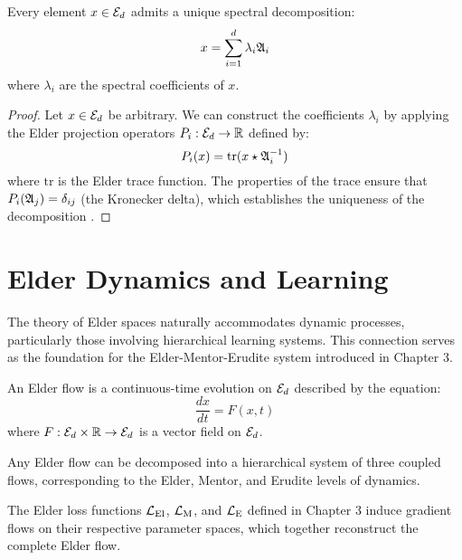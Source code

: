 \begin{theorem}
Every element $x \in \mathcal{E}_{d}$ admits a unique spectral decomposition:
\begin{equation}
x = \sum_{i=1}^{d} \lambda_i \mathfrak{A}_{i}
\end{equation}
where $\lambda_i$ are the spectral coefficients of $x$.
\end{theorem}

\begin{proof}
Let $x \in \mathcal{E}_{d}$ be arbitrary. We can construct the coefficients $\lambda_i$ by applying the Elder projection operators $P_i : \mathcal{E}_{d} \to \mathbb{R}$ defined by:
\begin{equation}
P_i(x) = \text{tr}(x \star \mathfrak{A}_{i}^{-1})
\end{equation}
where $\text{tr}$ is the Elder trace function. The properties of the trace ensure that $P_i(\mathfrak{A}_{j}) = \delta_{ij}$ (the Kronecker delta), which establishes the uniqueness of the decomposition \cite{yang2007elder}.
\end{proof}

\section{Elder Dynamics and Learning}

The theory of Elder spaces naturally accommodates dynamic processes, particularly those involving hierarchical learning systems. This connection serves as the foundation for the Elder-Mentor-Erudite system introduced in Chapter 3.

\begin{definition}
An Elder flow is a continuous-time evolution on $\mathcal{E}_{d}$ described by the equation:
\begin{equation}
\frac{dx}{dt} = F(x, t)
\end{equation}
where $F: \mathcal{E}_{d} \times \mathbb{R} \rightarrow \mathcal{E}_{d}$ is a vector field on $\mathcal{E}_{d}$.
\end{definition}

\begin{theorem}
Any Elder flow can be decomposed into a hierarchical system of three coupled flows, corresponding to the Elder, Mentor, and Erudite levels of dynamics.
\end{theorem}

\begin{corollary}
The Elder loss functions $\mathcal{L}_{\text{El}}$, $\mathcal{L}_{\text{M}}$, and $\mathcal{L}_{\text{E}}$ defined in Chapter 3 induce gradient flows on their respective parameter spaces, which together reconstruct the complete Elder flow.
\end{corollary}

